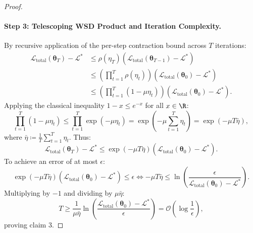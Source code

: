 \begin{proof}
\paragraph{Step 3: Telescoping WSD Product and Iteration Complexity.}
By recursive application of the per-step contraction bound across $T$ iterations:
\begin{align}
\mathcal{L}_{\text{total}}(\bm{\theta}_T) - \mathcal{L}^* &\le \rho(\eta_T) \left( \mathcal{L}_{\text{total}}(\bm{\theta}_{T-1}) - \mathcal{L}^* \right) \nonumber \\
&\le \left( \prod_{t=1}^T \rho(\eta_t) \right) \left( \mathcal{L}_{\text{total}}(\bm{\theta}_0) - \mathcal{L}^* \right) \nonumber \\
&\le \left( \prod_{t=1}^T (1 - \mu \eta_t) \right) \left( \mathcal{L}_{\text{total}}(\bm{\theta}_0) - \mathcal{L}^* \right).
\end{align}
Applying the classical inequality $1 - x \le e^{-x}$ for all $x \in \R$:
\begin{equation}
\prod_{t=1}^T (1 - \mu \eta_t) \le \prod_{t=1}^T \exp(-\mu \eta_t) = \exp\left( -\mu \sum_{t=1}^T \eta_t \right) = \exp(-\mu T \bar{\eta}),
\end{equation}
where $\bar{\eta} \coloneqq \frac{1}{T}\sum_{t=1}^T \eta_t$.
Thus:
\begin{equation}
\mathcal{L}_{\text{total}}(\bm{\theta}_T) - \mathcal{L}^* \le \exp(-\mu T \bar{\eta}) \left( \mathcal{L}_{\text{total}}(\bm{\theta}_0) - \mathcal{L}^* \right).
\end{equation}
To achieve an error of at most $\epsilon$:
\begin{equation}
\exp(-\mu T \bar{\eta}) \left( \mathcal{L}_{\text{total}}(\bm{\theta}_0) - \mathcal{L}^* \right) \le \epsilon \iff -\mu T \bar{\eta} \le \ln\left( \frac{\epsilon}{\mathcal{L}_{\text{total}}(\bm{\theta}_0) - \mathcal{L}^*} \right).
\end{equation}
Multiplying by $-1$ and dividing by $\mu \bar{\eta}$:
\begin{equation}
T \ge \frac{1}{\mu \bar{\eta}} \ln\left( \frac{\mathcal{L}_{\text{total}}(\bm{\theta}_0) - \mathcal{L}^*}{\epsilon} \right) = \mathcal{O}\left( \log\frac{1}{\epsilon} \right),
\end{equation}
proving claim 3.


\end{proof}
